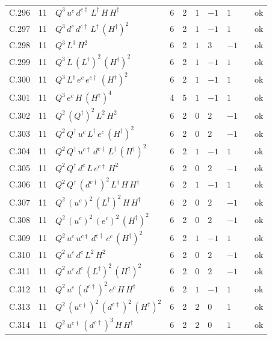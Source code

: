 {\begin{longtable}{@{}ll>{\raggedright\arraybackslash}p{6.4cm}rrllllr@{}}
C.296 & 11 & $Q^{3}\,u^c\,d^{c\dagger}\,L^\dagger\,H\,H^\dagger$ & 6 & 2 & $1$ & $-1$ & $1$ &  & ok \\
C.297 & 11 & $Q^{3}\,d^c\,d^{c\dagger}\,L^\dagger\,(H^\dagger)^{2}$ & 6 & 2 & $1$ & $-1$ & $1$ &  & ok \\
C.298 & 11 & $Q^{3}\,L^{3}\,H^{2}$ & 6 & 2 & $1$ & $3$ & $-1$ &  & ok \\
C.299 & 11 & $Q^{3}\,L\,(L^\dagger)^{2}\,(H^\dagger)^{2}$ & 6 & 2 & $1$ & $-1$ & $1$ &  & ok \\
C.300 & 11 & $Q^{3}\,L^\dagger\,e^c\,e^{c\dagger}\,(H^\dagger)^{2}$ & 6 & 2 & $1$ & $-1$ & $1$ &  & ok \\
C.301 & 11 & $Q^{3}\,e^c\,H\,(H^\dagger)^{4}$ & 4 & 5 & $1$ & $-1$ & $1$ &  & ok \\
C.302 & 11 & $Q^{2}\,(Q^\dagger)^{2}\,L^{2}\,H^{2}$ & 6 & 2 & $0$ & $2$ & $-1$ &  & ok \\
C.303 & 11 & $Q^{2}\,Q^\dagger\,u^c\,L^\dagger\,e^c\,(H^\dagger)^{2}$ & 6 & 2 & $0$ & $2$ & $-1$ &  & ok \\
C.304 & 11 & $Q^{2}\,Q^\dagger\,u^{c\dagger}\,d^{c\dagger}\,L^\dagger\,(H^\dagger)^{2}$ & 6 & 2 & $1$ & $-1$ & $1$ &  & ok \\
C.305 & 11 & $Q^{2}\,Q^\dagger\,d^c\,L\,e^{c\dagger}\,H^{2}$ & 6 & 2 & $0$ & $2$ & $-1$ &  & ok \\
C.306 & 11 & $Q^{2}\,Q^\dagger\,(d^{c\dagger})^{2}\,L^\dagger\,H\,H^\dagger$ & 6 & 2 & $1$ & $-1$ & $1$ &  & ok \\
C.307 & 11 & $Q^{2}\,(u^c)^{2}\,(L^\dagger)^{2}\,H\,H^\dagger$ & 6 & 2 & $0$ & $2$ & $-1$ &  & ok \\
C.308 & 11 & $Q^{2}\,(u^c)^{2}\,(e^c)^{2}\,(H^\dagger)^{2}$ & 6 & 2 & $0$ & $2$ & $-1$ &  & ok \\
C.309 & 11 & $Q^{2}\,u^c\,u^{c\dagger}\,d^{c\dagger}\,e^c\,(H^\dagger)^{2}$ & 6 & 2 & $1$ & $-1$ & $1$ &  & ok \\
C.310 & 11 & $Q^{2}\,u^c\,d^c\,L^{2}\,H^{2}$ & 6 & 2 & $0$ & $2$ & $-1$ &  & ok \\
C.311 & 11 & $Q^{2}\,u^c\,d^c\,(L^\dagger)^{2}\,(H^\dagger)^{2}$ & 6 & 2 & $0$ & $2$ & $-1$ &  & ok \\
C.312 & 11 & $Q^{2}\,u^c\,(d^{c\dagger})^{2}\,e^c\,H\,H^\dagger$ & 6 & 2 & $1$ & $-1$ & $1$ &  & ok \\
C.313 & 11 & $Q^{2}\,(u^{c\dagger})^{2}\,(d^{c\dagger})^{2}\,(H^\dagger)^{2}$ & 6 & 2 & $2$ & $0$ & $1$ &  & ok \\
C.314 & 11 & $Q^{2}\,u^{c\dagger}\,(d^{c\dagger})^{3}\,H\,H^\dagger$ & 6 & 2 & $2$ & $0$ & $1$ &  & ok \\

\end{longtable}}
